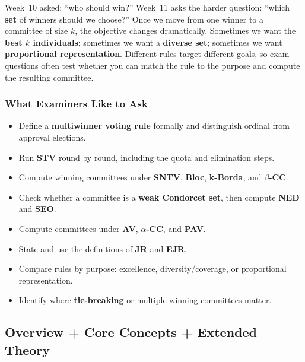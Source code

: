 Week~10 asked: ``who should win?'' Week~11 asks the harder question: ``which \textbf{set} of winners should we choose?'' Once we move from one winner to a committee of size $k$, the objective changes dramatically. Sometimes we want the \textbf{best $k$ individuals}; sometimes we want a \textbf{diverse set}; sometimes we want \textbf{proportional representation}. Different rules target different goals, so exam questions often test whether you can match the rule to the purpose and compute the resulting committee.

\separator

\subsubsection*{What Examiners Like to Ask}

\begin{itemize}
  \item Define a \textbf{multiwinner voting rule} formally and distinguish ordinal from approval elections.
  \item Run \textbf{STV} round by round, including the quota and elimination steps.
  \item Compute winning committees under \textbf{SNTV}, \textbf{Bloc}, \textbf{k-Borda}, and \textbf{$\beta$-CC}.
  \item Check whether a committee is a \textbf{weak Condorcet set}, then compute \textbf{NED} and \textbf{SEO}.
  \item Compute committees under \textbf{AV}, \textbf{$\alpha$-CC}, and \textbf{PAV}.
  \item State and use the definitions of \textbf{JR} and \textbf{EJR}.
  \item Compare rules by purpose: excellence, diversity/coverage, or proportional representation.
  \item Identify where \textbf{tie-breaking} or multiple winning committees matter.
\end{itemize}

\separator

\subsection{Overview + Core Concepts + Extended Theory}

